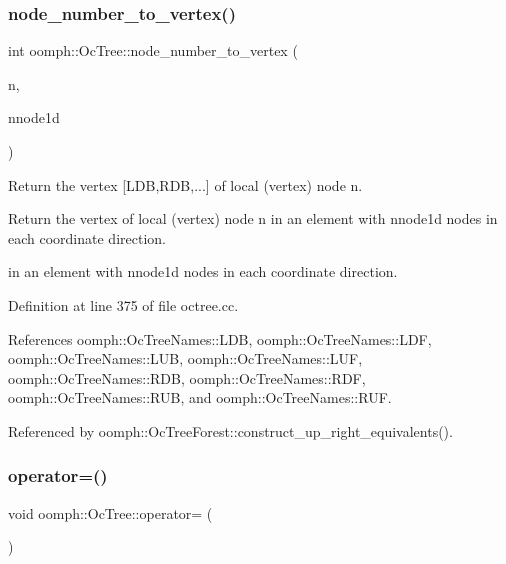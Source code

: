 \subsubsection{\texorpdfstring{node\+\_\+number\+\_\+to\+\_\+vertex()}{node\_number\_to\_vertex()}}
{\footnotesize\ttfamily int oomph\+::\+Oc\+Tree\+::node\+\_\+number\+\_\+to\+\_\+vertex (\begin{DoxyParamCaption}\item[{const unsigned \&}]{n,  }\item[{const unsigned \&}]{nnode1d }\end{DoxyParamCaption})\hspace{0.3cm}{\ttfamily [static]}}



Return the vertex \mbox{[}L\+DB,R\+DB,...\mbox{]} of local (vertex) node n. 

Return the vertex of local (vertex) node n in an element with nnode1d nodes in each coordinate direction.

in an element with nnode1d nodes in each coordinate direction. 

Definition at line 375 of file octree.\+cc.



References oomph\+::\+Oc\+Tree\+Names\+::\+L\+DB, oomph\+::\+Oc\+Tree\+Names\+::\+L\+DF, oomph\+::\+Oc\+Tree\+Names\+::\+L\+UB, oomph\+::\+Oc\+Tree\+Names\+::\+L\+UF, oomph\+::\+Oc\+Tree\+Names\+::\+R\+DB, oomph\+::\+Oc\+Tree\+Names\+::\+R\+DF, oomph\+::\+Oc\+Tree\+Names\+::\+R\+UB, and oomph\+::\+Oc\+Tree\+Names\+::\+R\+UF.



Referenced by oomph\+::\+Oc\+Tree\+Forest\+::construct\+\_\+up\+\_\+right\+\_\+equivalents().

\mbox{\label{classoomph_1_1OcTree_ad17a3abb1a8d3f980f781f7b4e131e88}} 
\subsubsection{\texorpdfstring{operator=()}{operator=()}}
{\footnotesize\ttfamily void oomph\+::\+Oc\+Tree\+::operator= (\begin{DoxyParamCaption}\item[{const \hyperlink{classoomph_1_1OcTree}{Oc\+Tree} \&}]{ }\end{DoxyParamCaption})\hspace{0.3cm}{\ttfamily [inline]}}



